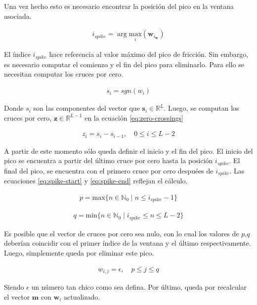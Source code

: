 \indent Una vez hecho esto es necesario encontrar la posición del pico en la ventana asociada.

\begin{align}
  i_{spike} = \arg \underset{i}{\mathrm{max}} (\bm{w}_{i_{\bm{w}}})
\end{align}

\indent El índice $i_{spike}$ hace referencia al valor máximo del pico de fricción. Sin embargo, es necesario
computar el comienzo y el fin del pico para eliminarlo. Para ello se necesitan computar los cruces por cero.

\begin{align}
  s_i = sgn(w_i)
\end{align}

\indent Donde $s_i$ son las componentes del vector que $\mathbf{s}_i \in \mathbb{R}^L$. Luego, se computan los
cruces por cero, $\mathbf{z} \in \mathbb{R}^{L-1}$ en la ecuación \ref{eq:zero-crossings}

\begin{align} \label{eq:zero-crossings}
z_i = s_i - s_{i-1}, \quad 0 \leq i \leq L-2
\end{align}

\indent A partir de este momento sólo queda definir el inicio y el fin del pico. El inicio del pico se encuentra a
partir del último cruce por cero hasta la posición $i_{spike}$. El final del pico, se encuentra con el primero cruce
por cero despuées de $i_{spike}$. Las ecuaciones \ref{eq:spike-start} y \ref{eq:spike-end} reflejan el cálculo.

\begin{align} \label{eq:spike-start}
p = \mathrm{max}\big\{n \in \mathbb{N}_0 \; | \; n \leq i_{spike}-1\big\}
\end{align}

\begin{align} \label{eq:spike-end}
q = \mathrm{min}\big\{n \in \mathbb{N}_0 \; | \; i_{spike} \leq n \leq L-2\big\}
\end{align}

\indent Es posible que el vector de cruces por cero sea nulo, con lo cual los valores de $p$,$q$ deberían coincidir
con el primer índice de la ventana y el último respectivamente. Luego, simplemente queda por eliminar este pico.

\begin{align}
  w_{i,j} = \epsilon, \quad p \leq j \leq q
\end{align}

\indent Siendo $\epsilon$ un número tan chico como sea defina. Por último, queda por recalcular el vector
$\mathbf{m}$ con $\mathbf{w}_i$ actualizado. \bigskip

